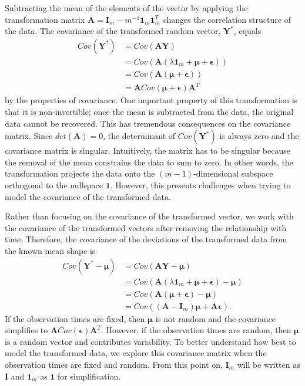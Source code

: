 \documentclass[12pt]{article}
\newcommand{\B}[0]{\mathbf}
\newcommand{\BS}[0]{\boldsymbol}
\begin{document}
Subtracting the mean of the elements of the vector by applying the transformation matrix $\B A = \B I_{m}-m^{-1}\B 1_{m}\B 1_{m}^{T}$ changes the correlation structure of the data. The covariance of the transformed random vector, $\B Y^{*}$, equals
\begin{align*}
Cov(\B Y^{*})&=Cov(\B A\B Y)\\
&=Cov( \B A(\lambda\B 1_{m}+ \BS\mu + \BS\epsilon))\\
&=Cov( \B A( \BS\mu + \BS\epsilon))\\
&= \B ACov( \BS\mu + \BS\epsilon)\B A^{T}
\end{align*}
by the properties of covariance. One important property of this transformation is that it is non-invertible; once the mean is subtracted from the data, the original data cannot be recovered. This has tremendous consequences on the covariance matrix. Since $det(\B A) = 0$, the determinant of $Cov(\B Y^{*})$ is always zero and the covariance matrix is singular. Intuitively, the matrix has to be singular because the removal of the mean constrains the data to sum to zero. In other words, the transformation projects the data onto the $(m-1)$-dimensional subspace orthogonal to the nullspace $\B 1$. However, this presents challenges when trying to model the covariance of the transformed data. 

Rather than focusing on the covariance of the transformed vector, we work with the covariance of the transformed vectors after removing the relationship with time. Therefore, the covariance of the deviations of the transformed data from the known mean shape is
\begin{align*}
Cov(\B Y^{*} - \BS\mu) &= Cov(\B A\B Y - \BS\mu)\\
&= Cov(\B A(\lambda\B 1_{m} + \BS\mu + \BS\epsilon) - \BS\mu)\\
&= Cov(\B A(\BS\mu + \BS\epsilon) - \BS\mu)\\
&= Cov((\B A-\B I_{m})\BS\mu + \B A \BS\epsilon).
\end{align*}
If the observation times are fixed, then $\BS \mu$ is not random and the covariance simplifies to $\B A Cov(\BS\epsilon)\B A^{T}$. However, if the observation times are random, then $\BS \mu$ is a random vector and contributes variability. To better understand how best to model the transformed data, we explore this covariance matrix when the observation times are fixed and random. From this point on, $\B I_{m}$ will be written as $\B I$ and $\B 1_{m}$ as $\B 1$ for simplification.
\end{document}
